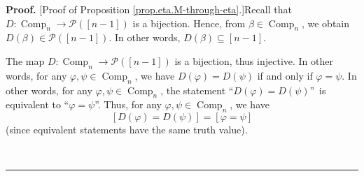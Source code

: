 \documentclass[numbers=enddot,12pt,final,onecolumn,notitlepage]{scrartcl}%
\theoremstyle{definition}
\newenvironment{proof}[1][Proof]{\noindent\textbf{#1.} }{\ \rule{0.5em}{0.5em}}
\newenvironment{verlong}{}{}
\begin{document}
\begin{verlong}


\begin{proof}
[Proof of Proposition \ref{prop.eta.M-through-eta}.]Recall that
$D:\operatorname*{Comp}\nolimits_{n}\rightarrow\mathcal{P}\left(  \left[
n-1\right]  \right)  $ is a bijection. Hence, from $\beta\in
\operatorname*{Comp}\nolimits_{n}$, we obtain $D\left(  \beta\right)
\in\mathcal{P}\left(  \left[  n-1\right]  \right)  $. In other words,
$D\left(  \beta\right)  \subseteq\left[  n-1\right]  $.

The map $D:\operatorname*{Comp}\nolimits_{n}\rightarrow\mathcal{P}\left(
\left[  n-1\right]  \right)  $ is a bijection, thus injective. In other words,
for any $\varphi,\psi\in\operatorname*{Comp}\nolimits_{n}$, we have $D\left(
\varphi\right)  =D\left(  \psi\right)  $ if and only if $\varphi=\psi$. In
other words, for any $\varphi,\psi\in\operatorname*{Comp}\nolimits_{n}$, the
statement \textquotedblleft$D\left(  \varphi\right)  =D\left(  \psi\right)
$\textquotedblright\ is equivalent to \textquotedblleft$\varphi=\psi
$\textquotedblright. Thus, for any $\varphi,\psi\in\operatorname*{Comp}%
\nolimits_{n}$, we have%
\begin{equation}
\left[  D\left(  \varphi\right)  =D\left(  \psi\right)  \right]  =\left[
\varphi=\psi\right]  \label{pf.prop.eta.M-through-eta.long.0}%
\end{equation}
(since equivalent statements have the same truth value).


\end{proof}
\end{verlong}
\end{document}
